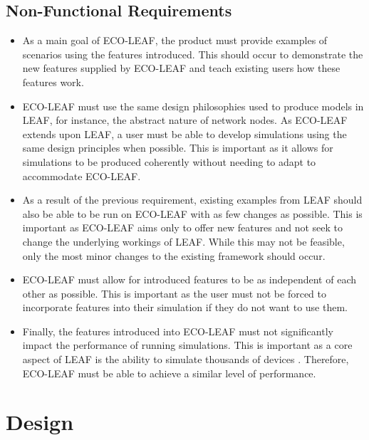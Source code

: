 \documentclass{l4proj}
\begin{document}
\section{Non-Functional Requirements}
\begin{itemize}
    \item As a main goal of ECO-LEAF, the product must provide examples of scenarios using the features introduced. This should occur to demonstrate the new features supplied by ECO-LEAF and teach existing users how these features work.
    \item ECO-LEAF must use the same design philosophies used to produce models in LEAF, for instance, the abstract nature of network nodes. As ECO-LEAF extends upon LEAF, a user must be able to develop simulations using the same design principles when possible. This is important as it allows for simulations to be produced coherently without needing to adapt to accommodate ECO-LEAF.
    \item As a result of the previous requirement, existing examples from LEAF should also be able to be run on ECO-LEAF with as few changes as possible. This is important as ECO-LEAF aims only to offer new features and not seek to change the underlying workings of LEAF. While this may not be feasible, only the most minor changes to the existing framework should occur.
    \item ECO-LEAF must allow for introduced features to be as independent of each other as possible. This is important as the user must not be forced to incorporate features into their simulation if they do not want to use them.
    \item Finally, the features introduced into ECO-LEAF must not significantly impact the performance of running simulations. This is important as a core aspect of LEAF is the ability to simulate thousands of devices \citep{leaf2021}. Therefore, ECO-LEAF must be able to achieve a similar level of performance.
\end{itemize}
\chapter{Design}\label{ch:design}


\end{document}
